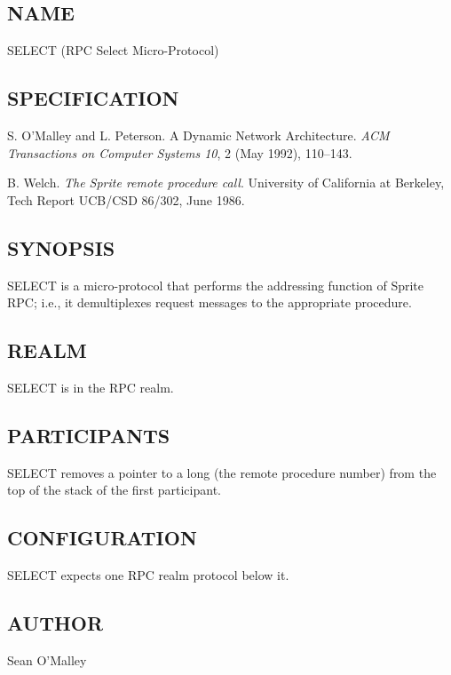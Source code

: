 %
%
%

\subsection*{NAME}

\noindent SELECT (RPC Select Micro-Protocol)

\subsection*{SPECIFICATION}

\noindent 
S. O'Malley and L. Peterson.  A Dynamic Network Architecture.  {\it
ACM Transactions on Computer Systems 10}, 2 (May 1992), 110--143.

\medskip
\noindent  B. Welch. {\it The Sprite remote procedure call}. 
University of California at Berkeley, Tech Report UCB/CSD 86/302,
June 1986.

\subsection*{SYNOPSIS}

\noindent SELECT is a micro-protocol that performs the addressing
function of Sprite RPC; i.e., it demultiplexes request messages to the
appropriate procedure.  

\subsection*{REALM}

SELECT is in the RPC realm.

\subsection*{PARTICIPANTS}

SELECT removes a pointer to a long (the remote procedure number) from
the top of the stack of the first participant.  

\subsection*{CONFIGURATION}

SELECT expects one RPC realm protocol below it.

\subsection*{AUTHOR}

\noindent Sean O'Malley 
